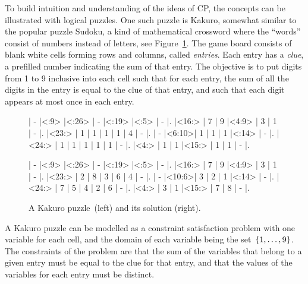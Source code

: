 \documentclass[a4paper,11pt]{article}
\numberwithin{equation}{section}
\begin{document}
To build intuition and understanding of the ideas of CP,
the concepts can be illustrated with logical puzzles. One such
puzzle is Kakuro, somewhat similar to the popular puzzle Sudoku,
a kind of mathematical crossword where the ``words'' consist
of numbers instead of letters, see Figure~\ref{fig:kakuro}.
The game board consists of 
blank white cells forming rows and columns, called \emph{entries}.
Each entry has a \emph{clue}, a prefilled number indicating the sum of that entry.
The objective is to put digits from 1 to 9 inclusive into each cell such 
that for each entry,
the sum of all the digits in the entry is equal to the clue of that entry,
and such that each digit appears at most once in each entry.

\begin{figure}
  \centering
  \begin{minipage}{.45\textwidth}
    
    \begin{Kakuro}{6}{6}
      |  -   |<:9>  |<:26> |  -   |<:19> |<:5>  |  -   |.
      |<16:> |  7   |  9   |<4:9> |  3   |  1   |  -   |.
      |<23:> |  1   |  1   |  1   |  1   |  4   |  -   |.
      |  -   |<6:10>|  1   |  1   |  1   |<:14> |  -   |.
      |<24:> |  1   |  1   |  1   |  1   |  1   |  -   |.
      |<4:>  |  1   |  1   |<15:> |  1   |  1   |  -   |.
    \end{Kakuro}
  \end{minipage}
  \begin{minipage}{.45\textwidth}
    \PuzzleSolution
    \begin{Kakuro}{6}{6}
      |  -   |<:9>  |<:26> |  -   |<:19> |<:5>  |  -   |.
      |<16:> |  7   |  9   |<4:9> |  3   |  1   |  -   |.
      |<23:> |  2   |  8   |  3   |  6   |  4   |  -   |.
      |  -   |<10:6>|  3   |  2   |  1   |<:14> |  -   |.
      |<24:> |  7   |  5   |  4   |  2   |  6   |  -   |.
      |<4:>  |  3   |  1   |<15:> |  7   |  8   |  -   |.
    \end{Kakuro}
  \end{minipage}
  \caption{A Kakuro puzzle~\protect\footnotemark (left) and its solution (right).}
  \label{fig:kakuro}
\end{figure}


A Kakuro puzzle can be modelled as a constraint satisfaction problem with one variable
for each cell, and the domain of each variable being the set~$\left\{1,\ldots,9\right\}$.
The constraints of the problem are that the sum of the variables that
belong to a given entry must be equal to the clue for that entry, and that the
values of the variables for each entry must be distinct.
\end{document}
